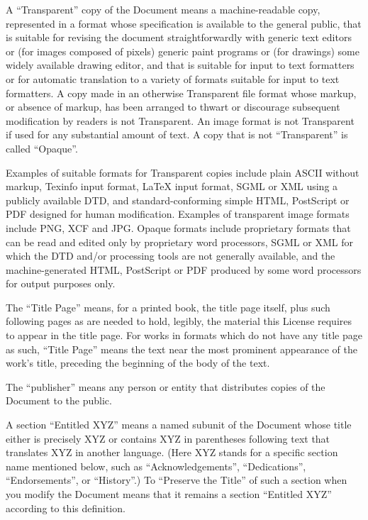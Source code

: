 \documentclass[12pt,a4paperpaper,]{report}
\begin{document}
A ``Transparent'' copy of the Document means a machine-readable copy,
represented in a format whose specification is available to the general
public, that is suitable for revising the document straightforwardly
with generic text editors or (for images composed of pixels) generic
paint programs or (for drawings) some widely available drawing editor,
and that is suitable for input to text formatters or for automatic
translation to a variety of formats suitable for input to text
formatters. A copy made in an otherwise Transparent file format whose
markup, or absence of markup, has been arranged to thwart or discourage
subsequent modification by readers is not Transparent. An image format
is not Transparent if used for any substantial amount of text. A copy
that is not ``Transparent'' is called ``Opaque''.

Examples of suitable formats for Transparent copies include plain ASCII
without markup, Texinfo input format, LaTeX input format, SGML or XML
using a publicly available DTD, and standard-conforming simple HTML,
PostScript or PDF designed for human modification. Examples of
transparent image formats include PNG, XCF and JPG. Opaque formats
include proprietary formats that can be read and edited only by
proprietary word processors, SGML or XML for which the DTD and/or
processing tools are not generally available, and the machine-generated
HTML, PostScript or PDF produced by some word processors for output
purposes only.

The ``Title Page'' means, for a printed book, the title page itself,
plus such following pages as are needed to hold, legibly, the material
this License requires to appear in the title page. For works in formats
which do not have any title page as such, ``Title Page'' means the text
near the most prominent appearance of the work's title, preceding the
beginning of the body of the text.

The ``publisher'' means any person or entity that distributes copies of
the Document to the public.

A section ``Entitled XYZ'' means a named subunit of the Document whose
title either is precisely XYZ or contains XYZ in parentheses following
text that translates XYZ in another language. (Here XYZ stands for a
specific section name mentioned below, such as ``Acknowledgements'',
``Dedications'', ``Endorsements'', or ``History''.) To ``Preserve the
Title'' of such a section when you modify the Document means that it
remains a section ``Entitled XYZ'' according to this definition.
\end{document}
